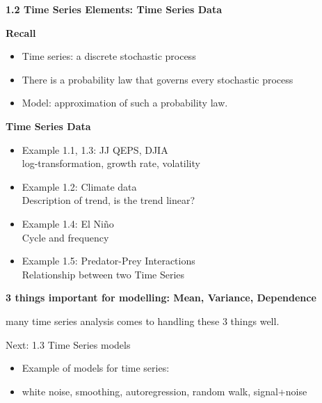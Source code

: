 \documentclass[12pt]{article} %
\date{}
\begin{document}
\textbf{\Large 1.2 Time Series Elements: Time Series Data}

\medskip


{}




\medskip
\medskip

\textbf{Recall}

\begin{itemize}
	\item Time series: a discrete stochastic process
	\item There is a probability law that governs every stochastic process
	\item Model: approximation of such a probability law.
\end{itemize}

\medskip
\textbf{Time Series Data}

\begin{itemize}
	\item Example 1.1, 1.3: JJ QEPS, DJIA\\ log-transformation, growth rate, volatility
	\item Example 1.2: Climate data\\ Description of trend, is the trend linear?
	\item Example 1.4: El Ni{\~n}o \\ Cycle and frequency
	\item Example 1.5: Predator-Prey Interactions \\  Relationship between two Time Series
\end{itemize}

\textbf{3 things important for modelling: Mean, Variance, Dependence}

many time series analysis comes to handling these 3 things well.

\hrulefill

Next: 1.3 Time Series models
\begin{itemize}
	\item Example of models for time series:
	\item white noise, smoothing, autoregression, random walk, signal+noise
\end{itemize}
\end{document}
